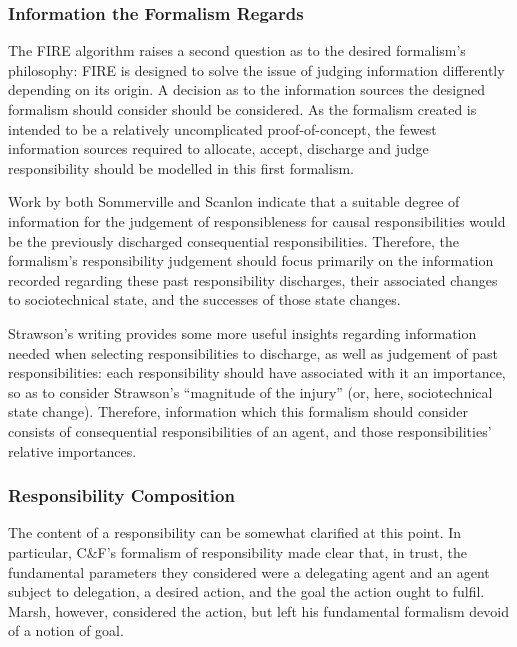 \subsubsection{Information the Formalism Regards}
The FIRE algorithm raises a second question as to the desired formalism's philosophy: FIRE is designed to solve the issue of judging information differently depending on its origin. A decision as to the information sources the designed formalism should consider should be considered. As the formalism created is intended to be a relatively uncomplicated proof-of-concept, the fewest information sources required to allocate, accept, discharge and judge responsibility should be modelled in this first formalism.\par

Work by both Sommerville and Scanlon indicate that a suitable degree of information for the judgement of responsibleness for causal responsibilities would be the previously discharged consequential responsibilities. Therefore, the formalism's responsibility judgement should focus primarily on the information recorded regarding these past responsibility discharges, their associated changes to sociotechnical state, and the successes of those state changes.\par

Strawson's writing provides some more useful insights regarding information needed when selecting responsibilities to discharge, as well as judgement of past responsibilities: each responsibility should have associated with it an importance, so as to consider Strawson's ``magnitude of the injury'' (or, here, sociotechnical state change). Therefore, information which this formalism should consider consists of consequential responsibilities of an agent, and those responsibilities' relative importances.\par

\subsubsection{Responsibility Composition}
The content of a responsibility can be somewhat clarified at this point. In particular, C\&F's formalism of responsibility made clear that, in trust, the fundamental parameters they considered were a delegating agent and an agent subject to delegation, a desired action, and the goal the action ought to fulfil. Marsh, however, considered the action, but left his fundamental formalism devoid of a notion of goal.\par

